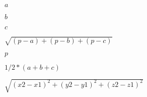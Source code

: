 \documentclass{article}
\begin{document}
$ a$
\pagebreak

$ b$
\pagebreak

$ c$
\pagebreak

$\sqrt{(p-a)+(p-b)+(p-c)}$
\pagebreak

$ p$
\pagebreak

$ 1/2 *(a+b+c)$
\pagebreak

$\sqrt{(x2-x1)^2+(y2-y1)^2+(z2-z1)^2}$
\pagebreak
\end{document}
